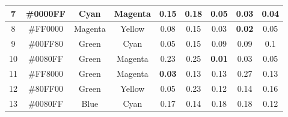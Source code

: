 \begin{table}[!htbp]
{\begin{tabular}{@{}ccccccccc@{}}
    \multicolumn{1}{|c|}{7}  & \multicolumn{1}{c|}{\cellcolor[HTML]{0000FF}\#0000FF} & \multicolumn{1}{c|}{Cyan}    & \multicolumn{1}{c||}{Magenta} & \multicolumn{1}{c|}{0.15}          & \multicolumn{1}{c|}{0.18}         & \multicolumn{1}{c|}{0.05}          & \multicolumn{1}{c|}{0.03}          & \multicolumn{1}{c|}{\textbf{0.04}} \\ \midrule
    \multicolumn{1}{|c|}{8}  & \multicolumn{1}{c|}{\cellcolor[HTML]{FF0000}\#FF0000} & \multicolumn{1}{c|}{Magenta} & \multicolumn{1}{c||}{Yellow}  & \multicolumn{1}{c|}{0.08}          & \multicolumn{1}{c|}{0.15}         & \multicolumn{1}{c|}{0.03}          & \multicolumn{1}{c|}{\textbf{0.02}} & \multicolumn{1}{c|}{0.05}          \\ \midrule
    \multicolumn{1}{|c|}{9}  & \multicolumn{1}{c|}{\cellcolor[HTML]{00FF80}\#00FF80} & \multicolumn{1}{c|}{Green}   & \multicolumn{1}{c||}{Cyan}    & \multicolumn{1}{c|}{0.05}          & \multicolumn{1}{c|}{0.15}         & \multicolumn{1}{c|}{0.09}          & \multicolumn{1}{c|}{0.09}          & \multicolumn{1}{c|}{0.1}           \\ \midrule
    \multicolumn{1}{|c|}{10} & \multicolumn{1}{c|}{\cellcolor[HTML]{0080FF}\#0080FF} & \multicolumn{1}{c|}{Green}   & \multicolumn{1}{c||}{Magenta} & \multicolumn{1}{c|}{0.23}          & \multicolumn{1}{c|}{0.25}         & \multicolumn{1}{c|}{\textbf{0.01}} & \multicolumn{1}{c|}{0.03}          & \multicolumn{1}{c|}{0.05}          \\ \midrule
    \multicolumn{1}{|c|}{11} & \multicolumn{1}{c|}{\cellcolor[HTML]{FF8000}\#FF8000} & \multicolumn{1}{c|}{Green}   & \multicolumn{1}{c||}{Magenta} & \multicolumn{1}{c|}{\textbf{0.03}} & \multicolumn{1}{c|}{0.13}         & \multicolumn{1}{c|}{0.13}          & \multicolumn{1}{c|}{0.27}          & \multicolumn{1}{c|}{0.13}          \\ \midrule
    \multicolumn{1}{|c|}{12} & \multicolumn{1}{c|}{\cellcolor[HTML]{80FF00}\#80FF00} & \multicolumn{1}{c|}{Green}   & \multicolumn{1}{c||}{Yellow}  & \multicolumn{1}{c|}{0.05}          & \multicolumn{1}{c|}{0.23}         & \multicolumn{1}{c|}{0.12}          & \multicolumn{1}{c|}{0.14}          & \multicolumn{1}{c|}{0.16}          \\ \midrule
    \multicolumn{1}{|c|}{13} & \multicolumn{1}{c|}{\cellcolor[HTML]{0080FF}\#0080FF} & \multicolumn{1}{c|}{Blue}    & \multicolumn{1}{c||}{Cyan}    & \multicolumn{1}{c|}{0.17}          & \multicolumn{1}{c|}{0.14}         & \multicolumn{1}{c|}{0.18}          & \multicolumn{1}{c|}{0.18}          & \multicolumn{1}{c|}{0.12}          \\ \midrule

\end{tabular}}
\end{table}
